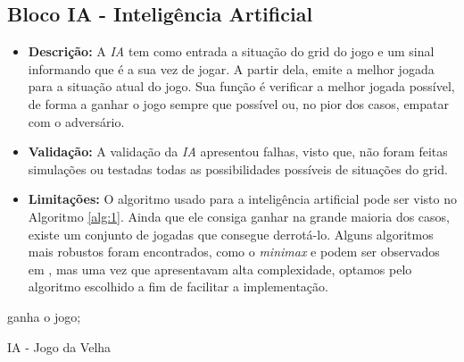 \subsection{Bloco IA - Inteligência Artificial}
    \begin{itemize}
        \item \textbf{Descrição:} A \emph{IA} tem como entrada a situação do grid do jogo e um sinal informando que é a sua vez de jogar. A partir dela, emite a melhor jogada para a situação atual do jogo. Sua função é  verificar a melhor jogada possível, de forma a ganhar o jogo sempre que possível ou, no pior dos casos, empatar com o adversário.
        \item \textbf{Validação:} A validação da \emph{IA} apresentou falhas, visto que, não foram feitas simulações ou testadas todas as possibilidades possíveis de situações do grid.
        \item \textbf{Limitações:} O algoritmo usado para a inteligência artificial pode ser visto no Algoritmo \ref{alg:1}. Ainda que ele consiga ganhar na grande maioria dos casos, existe um conjunto de jogadas que consegue derrotá-lo. Alguns algoritmos mais robustos foram encontrados, como o \emph{minimax} e podem ser observados em \cite{ref:velha-ia}, mas uma vez que apresentavam alta complexidade, optamos pelo algoritmo escolhido a fim de facilitar a implementação.
    \end{itemize}

    \begin{algorithm}[h!]
        \tiny{
            \BlankLine
            {
		        ganha o jogo;
            }
            
        }
        
        \caption{IA - Jogo da Velha} \label{alg:1}
    \end{algorithm}
    
